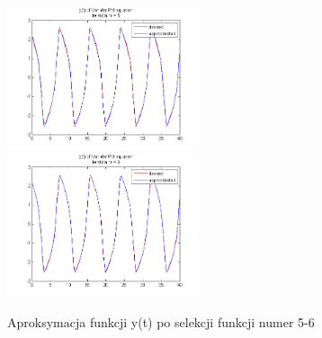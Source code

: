 \begin{figure}[ht!]
	\centering

	\subfloat
	{\includegraphics[width=0.5\textwidth]
	{images/signal_iter5.png}}
	\subfloat
	{\includegraphics[width=0.5\textwidth]
	{images/signal_iter6.png}}	

	\caption{Aproksymacja funkcji y(t) po selekcji funkcji numer 5-6}		
	\label{fig:signal_approx_b}		
\end{figure}

